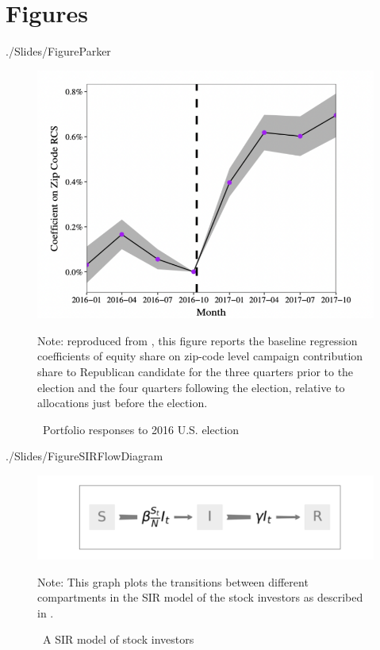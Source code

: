 \section*{Figures}


\begin{verbatimwrite}{./Slides/FigureParker}%
\begin{figure}[!ht] \centering  %
	\caption{ ~Portfolio responses to 2016 U.S. election}
	\label{fig:parker}
	\centerline{\includegraphics[width=\textwidth]{./figures/parker}}
	\begin{flushleft}
		{\footnotesize Note: reproduced from \cite{meeuwis2018belief}, this figure reports the baseline regression coefficients of equity share on zip-code level  campaign contribution share to Republican candidate for the three quarters prior to the election and the four quarters following the election, relative to allocations just before the election.}
	\end{flushleft}
\end{figure}
\end{verbatimwrite}%



\begin{verbatimwrite}{./Slides/FigureSIRFlowDiagram}%
\begin{figure}[!ht] \centering  %
	\caption{ ~A SIR model of stock investors}
		\label{fig:sir_diagram}
		\centerline{\includegraphics[width=\textwidth]{./figures/flow_diagram}}
		\begin{flushleft}
		{\footnotesize Note: This graph plots the transitions between different compartments in the SIR model of the stock investors as described in \cite{shiller1989survey}. }
			\end{flushleft}
	\end{figure}
\end{verbatimwrite}%


